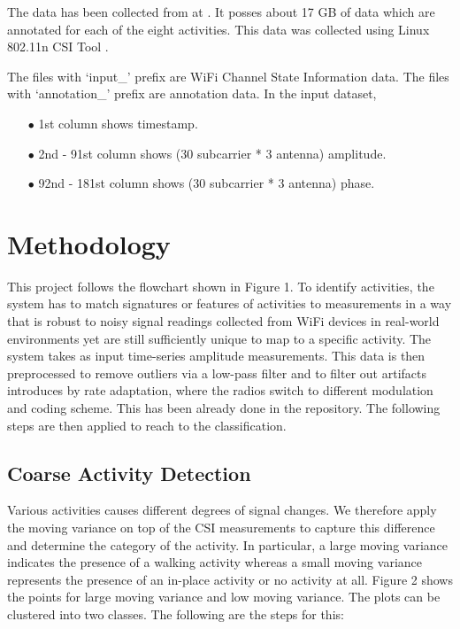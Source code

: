 \documentclass[letterpaper]{article}
\begin{document}
The data has been collected from \cite{c1} at \cite{c10}. It posses about 17 GB of data which are annotated for each of the eight activities. This data was collected using Linux 802.11n CSI Tool \cite{c8}.

The files with `input\_' prefix are WiFi Channel State Information data. The files with `annotation\_' prefix are annotation data. In the input dataset, 
\begin{itemize}
	\item[$\bullet$] 1st column shows timestamp.
	\item[$\bullet$] 2nd - 91st column shows (30 subcarrier * 3 antenna) amplitude.
	\item[$\bullet$] 92nd - 181st column shows (30 subcarrier * 3 antenna) phase.
\end{itemize}

\section{Methodology}

This project follows the flowchart shown in Figure 1. To identify activities, the system has to match signatures or features of activities to measurements in a way that is robust to noisy signal readings collected from WiFi devices in real-world environments yet are still sufficiently unique to map to a specific activity. The system takes as input time-series amplitude measurements. This data is then preprocessed to remove outliers via a low-pass filter and to filter out artifacts introduces by rate adaptation, where the radios switch to different modulation and coding scheme. This has been already done in the repository. The following steps are then applied to reach to the classification.

\subsection{Coarse Activity Detection}

Various activities causes different degrees of signal changes. We therefore apply the moving variance on top of the CSI measurements to capture this difference and determine the category of the activity. In particular, a large moving variance indicates the presence of a walking activity whereas a small moving variance represents the presence of an in-place activity or no activity at all. Figure 2 shows the points for large moving variance and low moving variance. The plots can be clustered into two classes. The following are the steps for this:
\end{document}
